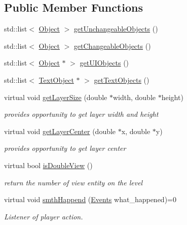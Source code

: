 \subsection*{Public Member Functions}
\begin{DoxyCompactItemize}
\item 
std\+::list$<$ \hyperlink{class_object}{Object} $>$ \hyperlink{class_layer_a88251ea7cc836a16dbca1e134c5a5ee5}{get\+Unchangeable\+Objects} ()
\item 
std\+::list$<$ \hyperlink{class_object}{Object} $>$ \hyperlink{class_layer_af1303bfbd28803f32708729f54ca13ec}{get\+Changeable\+Objects} ()
\item 
std\+::list$<$ \hyperlink{class_object}{Object} $\ast$ $>$ \hyperlink{class_layer_a2aebff84a5f25f25d56d3886c8c3a4b1}{get\+U\+I\+Objects} ()
\item 
std\+::list$<$ \hyperlink{class_text_object}{Text\+Object} $\ast$ $>$ \hyperlink{class_layer_abd1a2a8242a5d43b389e896a3d3de800}{get\+Text\+Objects} ()
\item 
virtual void \hyperlink{class_layer_a62b75693308f561bd8454a32dab9e10f}{get\+Layer\+Size} (double $\ast$width, double $\ast$height)
\begin{DoxyCompactList}\small\item\em provides opportunity to get layer width and height \end{DoxyCompactList}\item 
virtual void \hyperlink{class_layer_af2778374314bfe517007c0b0ac3fc896}{get\+Layer\+Center} (double $\ast$x, double $\ast$y)
\begin{DoxyCompactList}\small\item\em provides opportunity to get layer center \end{DoxyCompactList}\item 
virtual bool \hyperlink{class_layer_a952ad194d28fe6999b85bd3d9d28ee31}{is\+Double\+View} ()
\begin{DoxyCompactList}\small\item\em return the number of view entity on the level \end{DoxyCompactList}\item 
virtual void \hyperlink{class_layer_a41318993a0f6c7ba3bc6d964f7802c10}{smth\+Happend} (\hyperlink{_events_8h_af60e00b78607064c5be6aa9397ea49c1}{Events} what\+\_\+happened)=0
\begin{DoxyCompactList}\small\item\em Listener of player action. \end{DoxyCompactList}\item 

\end{DoxyCompactItemize}
